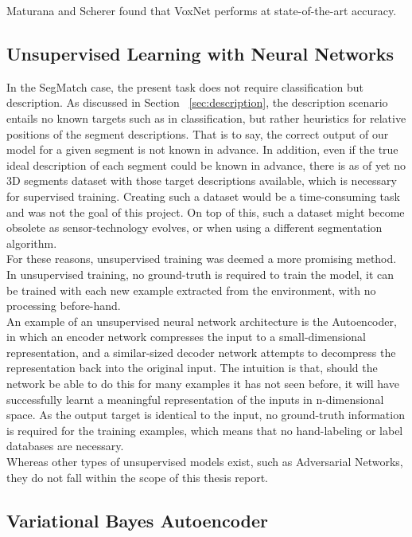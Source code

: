 Maturana and Scherer found that VoxNet performs at state-of-the-art accuracy.


\subsection{Unsupervised Learning with Neural Networks}
\label{subsec:autoencoder}

In the SegMatch case, the present task does not require classification but description. As discussed in Section ~\ref{sec:description}, the description scenario entails no known targets such as in classification, but rather heuristics for relative positions of the segment descriptions. That is to say, the correct output of our model for a given segment is not known in advance. In addition, even if the true ideal description of each segment could be known in advance, there is as of yet no 3D segments dataset with those target descriptions available, which is necessary for supervised training. Creating such a dataset would be a time-consuming task and was not the goal of this project. On top of this, such a dataset might become obsolete as sensor-technology evolves, or when using a different segmentation algorithm.\\

For these reasons, unsupervised training was deemed a more promising method. In unsupervised training, no ground-truth is required to train the model, it can be trained with each new example extracted from the environment, with no processing before-hand.\\

An example of an unsupervised neural network architecture is the Autoencoder, in which an encoder network compresses the input to a small-dimensional representation, and a similar-sized decoder network attempts to decompress the representation back into the original input. The intuition is that, should the network be able to do this for many examples it has not seen before, it will have successfully learnt a meaningful representation of the inputs in n-dimensional space. As the output target is identical to the input, no ground-truth information is required for the training examples, which means that no hand-labeling or label databases are necessary.\\

Whereas other types of unsupervised models exist, such as Adversarial Networks, they do not fall within the scope of this thesis report.

\subsection{Variational Bayes Autoencoder}
\label{subsec:variational-bayes}

